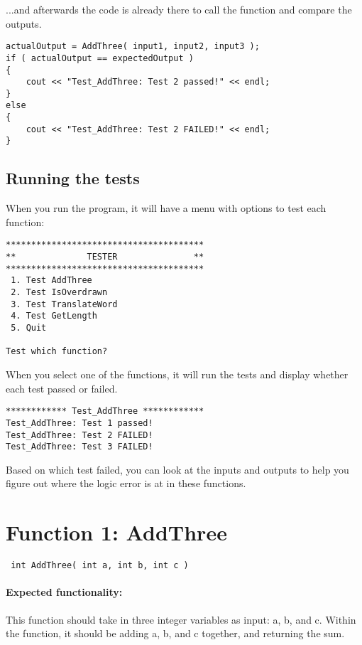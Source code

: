 \documentclass[a4paper,12pt]{book}
\begin{document}
    ...and afterwards the code is already there to call the function
    and compare the outputs.

\begin{lstlisting}[style=code]
actualOutput = AddThree( input1, input2, input3 );
if ( actualOutput == expectedOutput )
{
    cout << "Test_AddThree: Test 2 passed!" << endl;
}
else
{
    cout << "Test_AddThree: Test 2 FAILED!" << endl;
}
\end{lstlisting}

    \subsection*{Running the tests}

    When you run the program, it will have a menu with options to
    test each function:

\begin{lstlisting}[style=output]
***************************************
**              TESTER               **
***************************************
 1. Test AddThree
 2. Test IsOverdrawn
 3. Test TranslateWord
 4. Test GetLength
 5. Quit

Test which function? 
\end{lstlisting}

    When you select one of the functions, it will run the tests and display
    whether each test passed or failed.

\begin{lstlisting}[style=output]
************ Test_AddThree ************
Test_AddThree: Test 1 passed!
Test_AddThree: Test 2 FAILED!
Test_AddThree: Test 3 FAILED!
\end{lstlisting}

    Based on which test failed, you can look at the inputs and outputs
    to help you figure out where the logic error is at in these functions.
    
    \newpage
    \section*{Function 1: AddThree}

        \begin{verbatim} int AddThree( int a, int b, int c ) \end{verbatim}

        \paragraph{Expected functionality:} This function should take
        in three integer variables as input: a, b, and c. Within the
        function, it should be adding a, b, and c together, and returning
        the sum.
\end{document}
